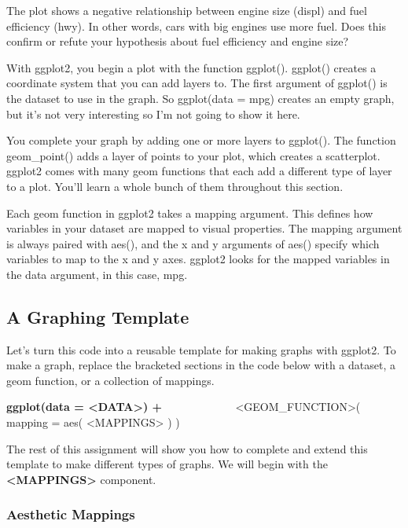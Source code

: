 \documentclass[
  letterpaper,
  DIV=11,
  numbers=noendperiod]{scrreprt}
\begin{document}
The plot shows a negative relationship between engine size (displ) and
fuel efficiency (hwy). In other words, cars with big engines use more
fuel. Does this confirm or refute your hypothesis about fuel efficiency
and engine size?

With ggplot2, you begin a plot with the function ggplot(). ggplot()
creates a coordinate system that you can add layers to. The first
argument of ggplot() is the dataset to use in the graph. So ggplot(data
= mpg) creates an empty graph, but it's not very interesting so I'm not
going to show it here.

You complete your graph by adding one or more layers to ggplot(). The
function geom\_point() adds a layer of points to your plot, which
creates a scatterplot. ggplot2 comes with many geom functions that each
add a different type of layer to a plot. You'll learn a whole bunch of
them throughout this section.

Each geom function in ggplot2 takes a mapping argument. This defines how
variables in your dataset are mapped to visual properties. The mapping
argument is always paired with aes(), and the x and y arguments of aes()
specify which variables to map to the x and y axes. ggplot2 looks for
the mapped variables in the data argument, in this case, mpg.

\subsection*{A Graphing Template}\label{a-graphing-template}

Let's turn this code into a reusable template for making graphs with
ggplot2. To make a graph, replace the bracketed sections in the code
below with a dataset, a geom function, or a collection of mappings.

\textbf{ggplot(data = \textless DATA\textgreater) +} \(\hspace{1in}\)
\textless GEOM\_FUNCTION\textgreater( mapping = aes(
\textless MAPPINGS\textgreater{} ) )

The rest of this assignment will show you how to complete and extend
this template to make different types of graphs. We will begin with the
\textbf{\textless MAPPINGS\textgreater{}} component.

\subsubsection*{Aesthetic Mappings}\label{aesthetic-mappings}
\end{document}
